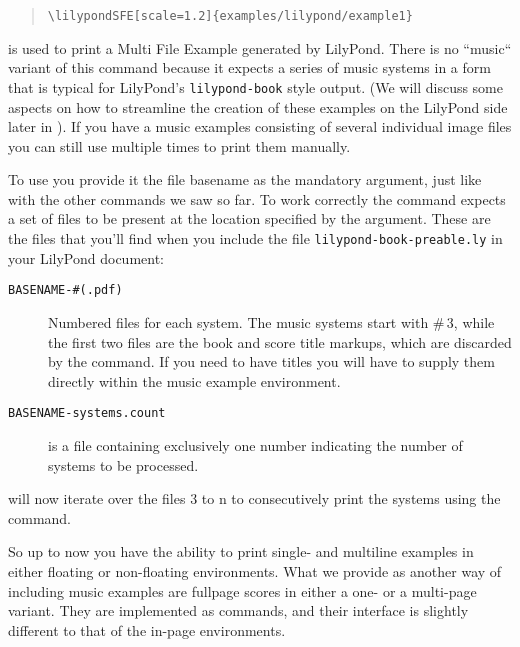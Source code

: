 \documentclass{OLLbook}
\begin{document}

\begin{quote}
\begin{verbatim}
\lilypondSFE[scale=1.2]{examples/lilypond/example1}
\end{verbatim}
\end{quote}

 is used to print a Multi File Example generated by LilyPond.
There is no “music“ variant of this command because it expects a series of music systems in a form that is typical for LilyPond's \texttt{lilypond-book} style output.
(We will discuss some aspects on how to streamline the creation of these examples on the LilyPond side later in ).
If you have a music examples consisting of several individual image files you can still use  multiple times to print them manually.

To use  you provide it the file basename as the mandatory argument, just like with the other commands we saw so far.
To work correctly the command expects a set of files to be present at the location specified by the argument.
These are the files that you'll find when you include the file \texttt{lilypond-book-preable.ly} in your LilyPond document:
\begin{description}
\item[\texttt{BASENAME-\#(.pdf)}] Numbered files for each system.
The music systems start with \#\,3, while the first two files are the book and score title markups, which are discarded by the command.
If you need to have titles you will have to supply them directly within the music example environment.
\item[\texttt{BASENAME-systems.count}] is a file containing exclusively one number indicating the number of systems to be processed.
\end{description}

 will now iterate over the files 3 to n to consecutively print the systems using the  command.


\bigskip
So up to now you have the ability to print single- and multiline examples in either floating or non-floating environments.
What we provide as another way of including music examples are fullpage scores in either a one- or a multi-page variant.
They are implemented as commands, and their interface is slightly different to that of the in-page environments.
\end{document}
